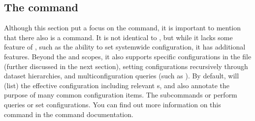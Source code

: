 \subsection{The  command}
\label{\detokenize{basics/101-122-config:the-datalad-configuration-command}}\label{\detokenize{basics/101-122-config:index-5}}
\sphinxAtStartPar
Although this section put a focus on the  command, it is important to mention that there also is a  command.
It is not identical to , but while it lacks some feature of , such as the ability to set system\sphinxhyphen{}wide configuration, it has additional features.
Beyond the  and  scopes, it also supports {\hyperref[\detokenize{glossary:term-branch}]{}} specific configurations in the  file (further discussed in the next section), setting configurations recursively through dataset hierarchies, and multi\sphinxhyphen{}configuration queries (such as ).
By default,  will  (list) the effective configuration including relevant  {\hyperref[\detokenize{glossary:term-environment-variable}]{}}s, and also annotate the purpose of many common configuration items.
The subcommands  or  perform queries or set configurations.
You can find out more information on this command in the command documentation.


